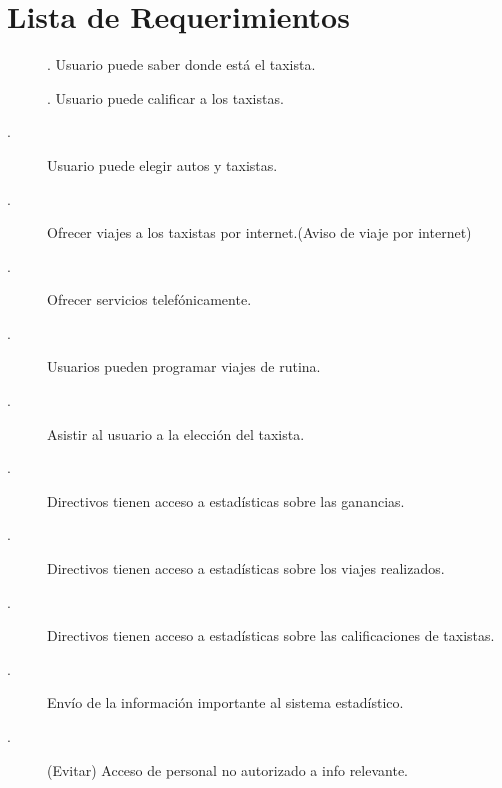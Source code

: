 \section{Lista de Requerimientos}
\label{sec:req}
	\begin{description}
		\item []. Usuario puede saber donde está el taxista.		
		\item []. Usuario puede calificar a los taxistas.		
		\item [.] Usuario puede elegir autos y taxistas.		
		\item [.] Ofrecer viajes a los taxistas por internet.(Aviso de viaje por internet)
		\item [.] Ofrecer servicios telefónicamente.		
		\item [.] Usuarios pueden programar viajes de 
		rutina.		
		\item [.] Asistir al usuario a la elección del taxista.		
		\item [.] Directivos tienen acceso a estadísticas sobre las ganancias.
		\item [.] Directivos tienen acceso a estadísticas sobre los viajes realizados.
		\item [.] Directivos tienen acceso a estadísticas sobre las calificaciones de taxistas.
		\item [.] Envío de la información importante al sistema estadístico.
		\item [.] (Evitar) Acceso de personal no autorizado a info relevante.
		

\end{description}
